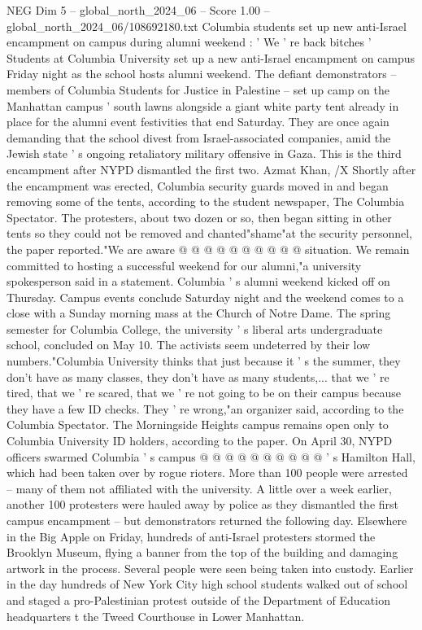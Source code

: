 \begin{textsample}{NEG Dim 5 – global\_north\_2024\_06 – Score 1.00 – global\_north\_2024\_06/108692180.txt}  \label{ex:f5_neg_138}
Columbia students set up new anti-Israel encampment on campus during alumni weekend : ' We ' re back bitches ' Students at Columbia University set up a new anti-Israel encampment on campus Friday night as the school hosts alumni weekend.
The defiant demonstrators -- members of Columbia Students for Justice in Palestine -- set up camp on the Manhattan campus ' south lawns alongside a giant white party tent already in place for the alumni event festivities that end Saturday.
They are once again demanding that the school divest from Israel-associated companies, amid the Jewish state ' s ongoing retaliatory military offensive in Gaza.
This is the third encampment after NYPD dismantled the first two.
Azmat Khan, /X Shortly after the encampment was erected, Columbia security guards moved in and began removing some of the tents, according to the student newspaper, The Columbia Spectator.
The protesters, about two dozen or so, then began sitting in other tents so they could not be removed and chanted"shame"at the security personnel, the paper reported."We are aware @ @ @ @ @ @ @ @ @ @ situation.
We remain committed to hosting a successful weekend for our alumni,"a university spokesperson said in a statement.
Columbia ' s alumni weekend kicked off on Thursday.
Campus events conclude Saturday night and the weekend comes to a close with a Sunday morning mass at the Church of Notre Dame.
The spring semester for Columbia College, the university ' s liberal arts undergraduate school, concluded on May 10.
The activists seem undeterred by their low numbers."Columbia University thinks that just because it ' s the summer, they don't have as many classes, they don't have as many students,... that we ' re tired, that we ' re scared, that we ' re not going to be on their campus because they have a few ID checks.
They ' re wrong,"an organizer said, according to the Columbia Spectator.
The Morningside Heights campus remains open only to Columbia University ID holders, according to the paper.
On April 30, NYPD officers swarmed Columbia ' s campus @ @ @ @ @ @ @ @ @ @ ' s Hamilton Hall, which had been taken over by rogue rioters.
More than 100 people were arrested -- many of them not affiliated with the university.
A little over a week earlier, another 100 protesters were hauled away by police as they dismantled the first campus encampment -- but demonstrators returned the following day.
Elsewhere in the Big Apple on Friday, hundreds of anti-Israel protesters stormed the Brooklyn Museum, flying a banner from the top of the building and damaging artwork in the process.
Several people were seen being taken into custody.
Earlier in the day hundreds of New York City high school students walked out of school and staged a pro-Palestinian protest outside of the Department of Education headquarters t the Tweed Courthouse in Lower Manhattan.

\end{textsample}

